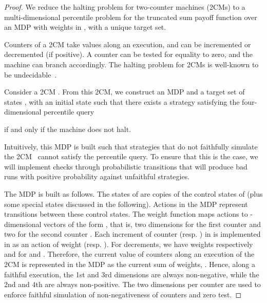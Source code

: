 \documentclass{llncs}
\begin{document}
\begin{proof}
We reduce the halting problem for two-counter machines (2CMs) to a multi-dimensional percentile problem for the truncated sum payoff function over an MDP with weights in , with a unique target set.

Counters of a 2CM take values  along an execution, and can be incremented or decremented (if positive). A counter can be tested for equality to zero, and the machine can branch accordingly.
The halting problem for 2CMs is well-known to be undecidable~\cite{minsky1961}.

Consider a 2CM . From this 2CM, we construct an MDP  and a target set of states , with an initial state  such that there exists a strategy  satisfying the four-dimensional percentile query

if and only if the machine does not halt.

Intuitively, this MDP is built such that strategies that do not faithfully simulate the 2CM~ cannot satisfy the percentile query. To ensure that this is the case, we will implement checks through probabilistic transitions that will produce bad runs with positive probability against unfaithful strategies.

The MDP  is built as follows. The states of  are copies of the control states of  (plus some special states discussed in the following). Actions in the MDP represent transitions between these control states. The weight function maps actions to -dimensional vectors of the form , that is, two dimensions for the first counter  and two for the second counter . Each increment of counter  (resp. ) in  is implemented in  as an action of weight  (resp. ). For decrements, we have weights respectively  and  for  and . Therefore, the current value of counters  along an execution of the 2CM  is represented in the MDP as the current sum of weights, . Hence, along a faithful execution, the 1st and 3rd dimensions are always non-negative, while the 2nd and 4th are always non-positive. The two dimensions per counter are used to enforce faithful simulation of non-negativeness of counters and zero test.


\end{proof}
\end{document}
